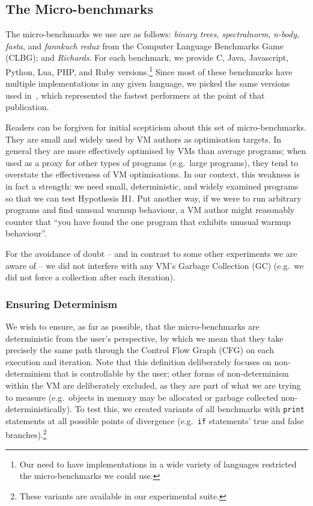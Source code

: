 \documentclass[a4paper,UKenglish]{lipics}
\newcommand{\hypone}{H1\xspace}
\newcommand{\binarytrees}{\emph{binary trees}\xspace}
\newcommand{\richards}{\emph{Richards}\xspace}
\newcommand{\spectralnorm}{\emph{spectralnorm}\xspace}
\newcommand{\nbody}{\emph{n-body}\xspace}
\newcommand{\fasta}{\emph{fasta}\xspace}
\newcommand{\fannkuch}{\emph{fannkuch redux}\xspace}
\begin{document}
\subsection{The Micro-benchmarks}

The micro-benchmarks we use are as follows: \binarytrees, \spectralnorm, \nbody,
\fasta, and \fannkuch from the Computer Language Benchmarks Game (CLBG); and
\richards. For each benchmark, we provide C, Java, Javascript, Python, Lua, PHP,
and Ruby versions.\footnote{Our need to have implementations in a wide variety
of languages restricted the micro-benchmarks we could use.} Since most of these
benchmarks have multiple implementations in any given language, we picked
the same versions used in~\cite{bolz14impact}, which represented the fastest
performers at the point of that publication.

Readers can be forgiven for initial scepticism about this set of micro-benchmarks.
They are small and widely
used by VM authors as optimisation targets. In general they are more effectively
optimised by VMs than average programs; when used as a proxy for other types
of programs (e.g.~large programs), they tend to overstate the effectiveness of
VM optimisations. In our context, this weakness is in fact a strength: we need
small, deterministic, and widely examined programs so that we can test
Hypothesis \hypone. Put another way, if we were to run arbitrary programs
and find unusual warmup behaviour, a VM author might reasonably counter that
``you have found the one program that exhibits unusual warmup behaviour''.

For the avoidance of doubt -- and in
contrast to some other experiments we are aware of  -- we
did not interfere with any VM's Garbage Collection (GC) (e.g.~we did not
force a collection after each iteration).


\subsubsection{Ensuring Determinism}

We wish to ensure, as far as possible, that the micro-benchmarks are
deterministic from the user's perspective, by which we mean that they
take precisely the same path through the Control Flow Graph (CFG) on each
execution and iteration. Note that this definition deliberately focuses
on non-determinism that is controllable by the user; other forms of
non-determinism within the VM are deliberately excluded, as they are
part of what we are trying to measure (e.g.~objects in memory may be allocated
or garbage collected non-deterministically). To test this, we created variants
of all benchmarks with \texttt{print} statements at all possible points of
divergence (e.g.~\texttt{if} statements' true and false branches).\footnote{These
variants are available in our experimental suite.}
\end{document}
